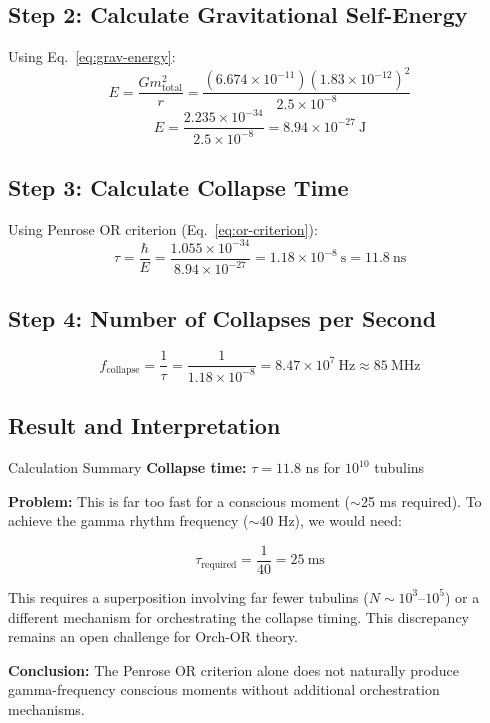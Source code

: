 \subsection*{Step 2: Calculate Gravitational Self-Energy}

Using Eq.~\ref{eq:grav-energy}:
\begin{equation}
E = \frac{G m_{\text{total}}^2}{r} = \frac{(6.674 \times 10^{-11})(1.83 \times 10^{-12})^2}{2.5 \times 10^{-8}}
\end{equation}
\begin{equation}
E = \frac{2.235 \times 10^{-34}}{2.5 \times 10^{-8}} = 8.94 \times 10^{-27}~\text{J}
\end{equation}

\subsection*{Step 3: Calculate Collapse Time}

Using Penrose OR criterion (Eq.~\ref{eq:or-criterion}):
\begin{equation}
\tau = \frac{\hbar}{E} = \frac{1.055 \times 10^{-34}}{8.94 \times 10^{-27}} = 1.18 \times 10^{-8}~\text{s} = 11.8~\text{ns}
\end{equation}

\subsection*{Step 4: Number of Collapses per Second}

\begin{equation}
f_{\text{collapse}} = \frac{1}{\tau} = \frac{1}{1.18 \times 10^{-8}} = 8.47 \times 10^{7}~\text{Hz} \approx 85~\text{MHz}
\end{equation}

\subsection*{Result and Interpretation}

\begin{calloutbox}[colback=black!8!white,colframe=black]{Calculation Summary}
\textbf{Collapse time:} $\tau = 11.8$ ns for $10^{10}$ tubulins

\textbf{Problem:} This is far too fast for a conscious moment ($\sim$25 ms required). To achieve the gamma rhythm frequency ($\sim$40 Hz), we would need:

\begin{equation}
\tau_{\text{required}} = \frac{1}{40} = 25~\text{ms}
\end{equation}

This requires a superposition involving far fewer tubulins ($N \sim 10^3$--$10^5$) or a different mechanism for orchestrating the collapse timing. This discrepancy remains an open challenge for Orch-OR theory.

\textbf{Conclusion:} The Penrose OR criterion alone does not naturally produce gamma-frequency conscious moments without additional orchestration mechanisms.
\end{calloutbox}

